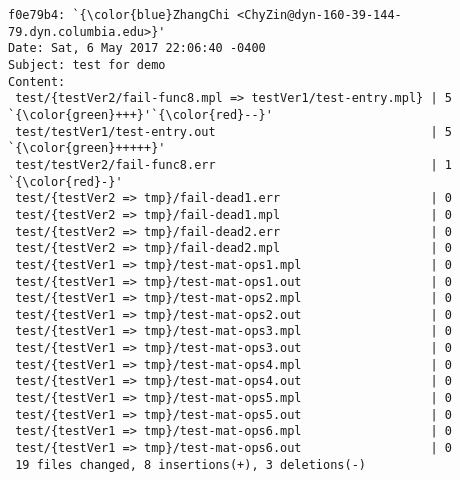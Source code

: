 \begin{lstlisting}
f0e79b4: `{\color{blue}ZhangChi <ChyZin@dyn-160-39-144-79.dyn.columbia.edu>}'
Date: Sat, 6 May 2017 22:06:40 -0400
Subject: test for demo
Content: 
 test/{testVer2/fail-func8.mpl => testVer1/test-entry.mpl} | 5 `{\color{green}+++}'`{\color{red}--}'
 test/testVer1/test-entry.out                              | 5 `{\color{green}+++++}'
 test/testVer2/fail-func8.err                              | 1 `{\color{red}-}'
 test/{testVer2 => tmp}/fail-dead1.err                     | 0
 test/{testVer2 => tmp}/fail-dead1.mpl                     | 0
 test/{testVer2 => tmp}/fail-dead2.err                     | 0
 test/{testVer2 => tmp}/fail-dead2.mpl                     | 0
 test/{testVer1 => tmp}/test-mat-ops1.mpl                  | 0
 test/{testVer1 => tmp}/test-mat-ops1.out                  | 0
 test/{testVer1 => tmp}/test-mat-ops2.mpl                  | 0
 test/{testVer1 => tmp}/test-mat-ops2.out                  | 0
 test/{testVer1 => tmp}/test-mat-ops3.mpl                  | 0
 test/{testVer1 => tmp}/test-mat-ops3.out                  | 0
 test/{testVer1 => tmp}/test-mat-ops4.mpl                  | 0
 test/{testVer1 => tmp}/test-mat-ops4.out                  | 0
 test/{testVer1 => tmp}/test-mat-ops5.mpl                  | 0
 test/{testVer1 => tmp}/test-mat-ops5.out                  | 0
 test/{testVer1 => tmp}/test-mat-ops6.mpl                  | 0
 test/{testVer1 => tmp}/test-mat-ops6.out                  | 0
 19 files changed, 8 insertions(+), 3 deletions(-)


\end{lstlisting}

